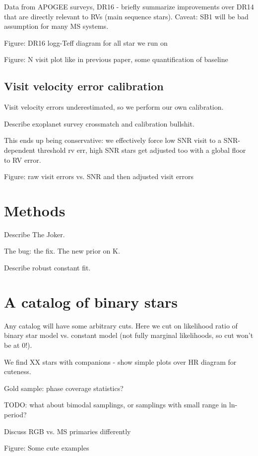 \documentclass[modern]{aastex62}
\begin{document}
Data from APOGEE surveys, DR16 - briefly summarize improvements over DR14 that are directly relevant to RVs (main sequence stars). Caveat: SB1 will be bad assumption for many MS systems.

Figure: DR16 logg-Teff diagram for all star we run on

Figure: N visit plot like in previous paper, some quantification of baseline

\subsection{Visit velocity error calibration} \label{sec:visitcalib}

Visit velocity errors underestimated, so we perform our own calibration.

Describe exoplanet survey crossmatch and calibration bullshit.

This ends up being conservative: we effectively force low SNR visit to a SNR-dependent threshold rv err, high SNR stars get adjusted too with a global floor to RV error.

Figure: raw visit errors vs. SNR and then adjusted visit errors


\section{Methods} \label{sec:methods}

Describe The Joker.

The bug: the fix. The new prior on K.

Describe robust constant fit.

\section{A catalog of binary stars} \label{sec:catalog}

Any catalog will have some arbitrary cuts. Here we cut on likelihood ratio of binary star model vs. constant model (not fully marginal likelihoods, so cut won't be at 0!).

We find XX stars with companions - show simple plots over HR diagram for cuteness.

Gold sample: phase coverage statistics?

TODO: what about bimodal samplings, or samplings with small range in ln-period?

Discuss RGB vs. MS primaries differently

Figure: Some cute examples
\end{document}
